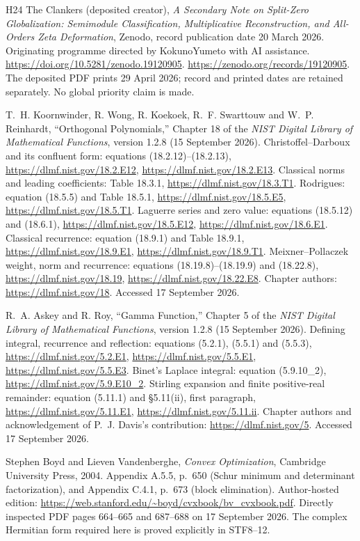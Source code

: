 \documentclass[11pt,a4paper]{article}
\begin{document}
\begin{thebibliography}{H24}
The Clankers (deposited creator), \emph{A Secondary Note on Split-Zero
Globalization: Semimodule Classification, Multiplicative Reconstruction,
and All-Orders Zeta Deformation}, Zenodo, record publication date
20 March 2026. Originating programme directed by KokunoYumeto
with AI assistance. \url{https://doi.org/10.5281/zenodo.19120905}.
\url{https://zenodo.org/records/19120905}.
The deposited PDF prints 29 April 2026; record and printed dates
are retained separately. No global priority claim is made.

T.~H. Koornwinder, R. Wong, R. Koekoek, R.~F. Swarttouw and
W.~P. Reinhardt,
``Orthogonal Polynomials,'' Chapter 18 of the
\emph{NIST Digital Library of Mathematical Functions},
version 1.2.8 (15 September 2026).
Christoffel--Darboux and its confluent form: equations (18.2.12)--(18.2.13),
\url{https://dlmf.nist.gov/18.2.E12},
\url{https://dlmf.nist.gov/18.2.E13}.
Classical norms and leading coefficients: Table 18.3.1,
\url{https://dlmf.nist.gov/18.3.T1}.
Rodrigues: equation (18.5.5) and Table 18.5.1,
\url{https://dlmf.nist.gov/18.5.E5},
\url{https://dlmf.nist.gov/18.5.T1}.
Laguerre series and zero value: equations (18.5.12) and (18.6.1),
\url{https://dlmf.nist.gov/18.5.E12},
\url{https://dlmf.nist.gov/18.6.E1}.
Classical recurrence: equation (18.9.1) and Table 18.9.1,
\url{https://dlmf.nist.gov/18.9.E1},
\url{https://dlmf.nist.gov/18.9.T1}.
Meixner--Pollaczek weight, norm and recurrence:
equations (18.19.8)--(18.19.9) and (18.22.8),
\url{https://dlmf.nist.gov/18.19},
\url{https://dlmf.nist.gov/18.22.E8}.
Chapter authors: \url{https://dlmf.nist.gov/18}.
Accessed 17 September 2026.

R.~A. Askey and R. Roy,
``Gamma Function,'' Chapter 5 of the
\emph{NIST Digital Library of Mathematical Functions},
version 1.2.8 (15 September 2026).
Defining integral, recurrence and reflection:
equations (5.2.1), (5.5.1) and (5.5.3),
\url{https://dlmf.nist.gov/5.2.E1},
\url{https://dlmf.nist.gov/5.5.E1},
\url{https://dlmf.nist.gov/5.5.E3}.
Binet's Laplace integral: equation (5.9.10\_2),
\url{https://dlmf.nist.gov/5.9.E10_2}.
Stirling expansion and finite positive-real remainder:
equation (5.11.1) and \S5.11(ii), first paragraph,
\url{https://dlmf.nist.gov/5.11.E1},
\url{https://dlmf.nist.gov/5.11.ii}.
Chapter authors and acknowledgement of P.~J. Davis's contribution:
\url{https://dlmf.nist.gov/5}.
Accessed 17 September 2026.

Stephen Boyd and Lieven Vandenberghe,
\emph{Convex Optimization}, Cambridge University Press, 2004.
Appendix A.5.5, p.~650 (Schur minimum and determinant factorization),
and Appendix C.4.1, p.~673 (block elimination).
Author-hosted edition: \url{https://web.stanford.edu/~boyd/cvxbook/bv_cvxbook.pdf}.
Directly inspected PDF pages 664--665 and 687--688 on 17 September 2026.
The complex Hermitian form required here is proved explicitly in STF8--12.


\end{thebibliography}
\end{document}
